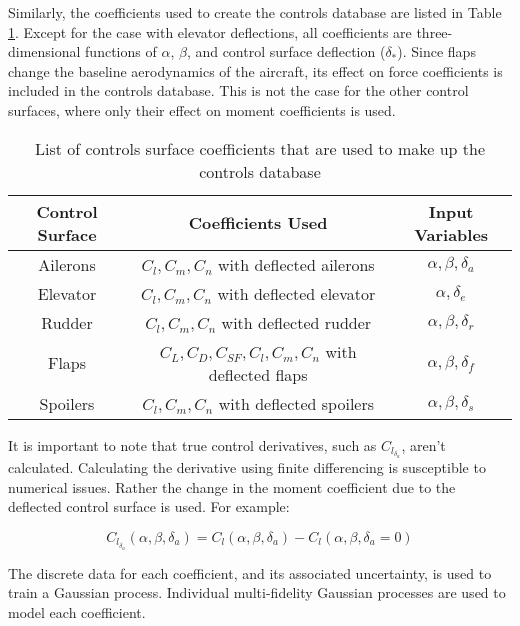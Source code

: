 Similarly, the coefficients used to create the controls database are listed in Table \ref{tab:control_db}. Except for the case with elevator deflections, all coefficients are three-dimensional functions of $\alpha$, $\beta$, and control surface deflection ($\delta_*$). Since flaps change the baseline aerodynamics of the aircraft, its effect on force coefficients is included in the controls database. This is not the case for the other control surfaces, where only their effect on moment coefficients is used. 

\begin{table}
    \renewcommand{\arraystretch}{1.2}
    \centering
    \begin{tabular}{ c|c|c } 
         Control Surface & Coefficients Used & Input Variables \\ 
         \hline
         Ailerons & $C_l, C_m, C_n$ with deflected ailerons & $\alpha, \beta, \delta_a$  \\
         Elevator & $C_l, C_m, C_n$ with deflected elevator & $\alpha, \delta_e$  \\
         Rudder & $C_l, C_m, C_n$ with deflected rudder & $\alpha, \beta, \delta_r$  \\
         Flaps & $C_L, C_D, C_{SF}, C_l, C_m, C_n$ with deflected flaps & $\alpha, \beta, \delta_f$  \\
         Spoilers & $C_l, C_m, C_n$ with deflected spoilers & $\alpha, \beta, \delta_s$  \\
    \end{tabular}
    \caption{List of controls surface coefficients that are used to make up the controls database}
    \label{tab:control_db}
\end{table}

It is important to note that true control derivatives, such as $C_{l_{\delta_a}}$, aren't calculated. Calculating the derivative using finite differencing is susceptible to numerical issues. Rather the change in the moment coefficient due to the deflected control surface is used. For example: 

\begin{equation}\label{equ:control_derivative}
    C_{l_{\delta_a}}(\alpha,\beta,\delta_a) = C_l(\alpha,\beta,\delta_a) - C_l(\alpha,\beta,\delta_a=0)
\end{equation}

The discrete data for each coefficient, and its associated uncertainty, is used to train a Gaussian process. Individual multi-fidelity Gaussian processes are used to model each coefficient.